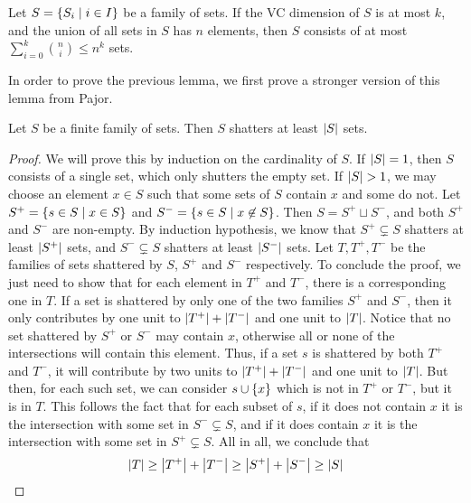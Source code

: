     \begin{lemma} \label{lemma:sauer-shelah}
        Let $S = \left\{ S_i \mid i \in I \right\}$ be a family of sets.
        If the VC dimension of $S$ is at most $k$, and the union of all sets in $S$ has $n$ elements, then
        $S$ consists of at most $\sum_{i=0}^{k} \binom{n}{i} \leq n^k$ sets.
        \newline

        In order to prove the previous lemma, we first prove a stronger version of this lemma from Pajor.

        \label{lemma:pajor}
            Let $S$ be a finite family of sets.
            Then $S$ shatters at least $\left| S \right|$ sets.
            \begin{proof}
                We will prove this by induction on the cardinality of $S$.
                If $\left| S \right| = 1$, then $S$ consists of a single set, which only shutters the empty set.
                If $\left| S \right| > 1$, we may choose an element $x \in S$ such that some sets of $S$ contain $x$ and some do not.
                Let $S^+ = \left\{ s \in S \mid x \in S \right\}$ and $S^- = \left\{ s \in S \mid x \not\in S \right\}$.
                Then $S = S^+ \sqcup S^-$, and both $S^+$ and $S^-$ are non-empty.
                By induction hypothesis, we know that $S^+ \subsetneq S$ shatters at least $\left| S^+ \right|$ sets,
                and $S^- \subsetneq S$ shatters at least $\left| S^- \right|$ sets.
                Let $T, T^+, T^-$ be the families of sets shattered by $S$, $S^+$ and $S^-$ respectively.
                To conclude the proof, we just need to show that for each element in $T^+$ and $T^-$, there is a corresponding
                one in $T$.
                If a set is shattered by only one of the two families $S^+$ and $S^-$, then it only contributes by one unit
                to $\left| T^+ \right| + \left| T^- \right|$ and one unit to $\left| T \right|$.
                Notice that no set shattered by $S^+$ or $S^-$ may contain $x$, otherwise all or none of the intersections
                will contain this element.
                Thus, if a set $s$ is shattered by both $T^+$ and $T^-$, it will contribute by two units to
                $\left| T^+ \right| + \left| T^- \right|$ and one unit to $\left| T \right|$.
                But then, for each such set, we can consider $s \cup \left\{ x \right\}$ which is not in $T^+$ or $T^-$, but it is in $T$.
                This follows the fact that for each subset of $s$, if it does not contain $x$ it is the intersection with some
                set in $S^- \subsetneq S$, and if it does contain $x$ it is the intersection with some set in $S^+ \subsetneq S$.
                All in all, we conclude that
                \[
                    \left| T \right| \geq \left| T^+ \right| + \left| T^- \right| \geq \left| S^+ \right| + \left| S^- \right|
                                    \geq \left| S \right|
                \]
            \end{proof}


\end{lemma}
